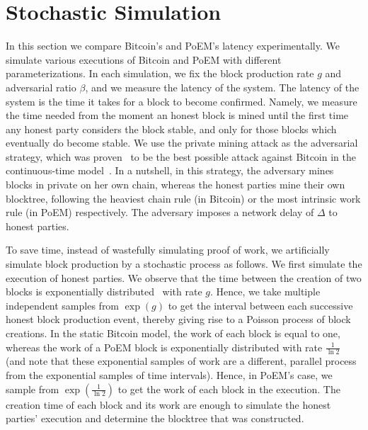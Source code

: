 \section{Stochastic Simulation}
In this section we compare Bitcoin's and PoEM's latency experimentally.
We simulate various executions of Bitcoin and PoEM with different parameterizations.
In each simulation, we fix the block production rate $g$ and adversarial ratio $\beta$, and we
measure the latency of the system.
The latency of the system is the time it takes for a block to become confirmed.
Namely, we measure the time needed from the moment an honest block is mined until
the first time any honest party considers the block stable, and only for those blocks
which eventually do become stable.
We use the private mining attack as the adversarial strategy, which was
proven~\cite{eiar} to be the best possible attack against Bitcoin in the continuous-time model~\cite{bitcoin-made-simple}.
In a nutshell, in this strategy, the adversary mines blocks in private on her own chain, whereas the honest parties mine
their own blocktree, following the heaviest chain rule (in Bitcoin) or the most intrinsic work rule (in PoEM) respectively.
The adversary imposes a network delay of $\Delta$ to honest parties.

To save time, instead of wastefully simulating proof of work, we artificially simulate block production by a stochastic process
as follows.
We first simulate the execution of honest parties. We observe that the time between the creation of two blocks is
exponentially distributed~\cite{bitcoin-made-simple} with rate $g$.
Hence, we take multiple independent samples from $\exp(g)$ to get the interval between each successive honest block production event,
thereby giving rise to a Poisson process of block creations. In the static Bitcoin model, the work of each block is equal to one,
whereas the work of a PoEM block is exponentially
distributed with rate $\frac{1}{\ln2}$ (and note that these exponential samples of work are a different, parallel process
from the exponential samples of time intervals). Hence, in PoEM's case, we sample from $\exp(\frac{1}{\ln2})$ to get the work
of each block in the execution. The creation time of each block and its work are enough to simulate the honest parties' execution
and determine the blocktree that was constructed.

